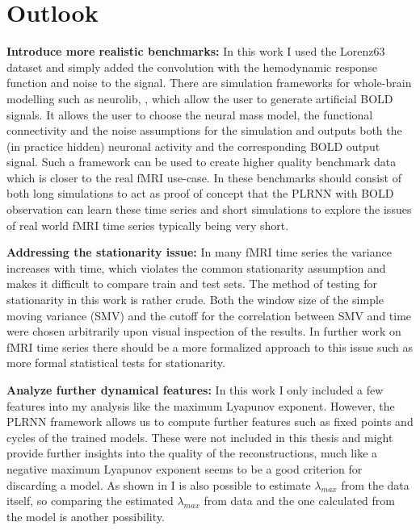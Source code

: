 \section{Outlook}

\textbf{Introduce more realistic benchmarks: } In this work I used the Lorenz63 dataset and simply added the convolution with the hemodynamic response function and noise to the signal.
There are simulation frameworks for whole-brain modelling such as neurolib, \cite{cakan2021}, which allow the user to generate artificial BOLD signals. It allows the user to choose 
the neural mass model, the functional connectivity and the noise assumptions for the simulation and outputs both the (in practice hidden) neuronal activity and the corresponding
BOLD output signal. Such a framework can be used to create higher quality benchmark data which is closer to the real fMRI use-case. In these benchmarks should consist of both long 
simulations to act as proof of concept that the PLRNN with BOLD observation can learn these time series and short simulations to explore the issues of real world fMRI time series 
typically being very short. 

\textbf{Addressing the stationarity issue: } In many fMRI time series the variance increases with time, which violates the common stationarity assumption and makes it difficult to compare 
train and test sets. The method of testing for stationarity in this work is rather crude. Both the window size of the simple moving variance (SMV) and the cutoff
for the correlation between SMV and time were chosen arbitrarily upon visual inspection of the results. In further work on fMRI time series there should be a more formalized approach to 
this issue such as more formal statistical tests for stationarity.

\textbf{Analyze further dynamical features: } In this work I only included a few features into my analysis like the maximum Lyapunov exponent. 
However, the PLRNN framework allows us to compute further features such as fixed points and cycles of the trained models. 
These were not included in this thesis and might provide further insights into the quality of the reconstructions, much like a negative maximum Lyapunov 
exponent seems to be a good criterion for discarding a model. As shown in \cite{mikhaeil2022difficulty} I is also possible to estimate $\lambda_{max}$ from the data itself, so comparing 
the estimated $\lambda_{max}$ from data and the one calculated from the model is another possibility.

